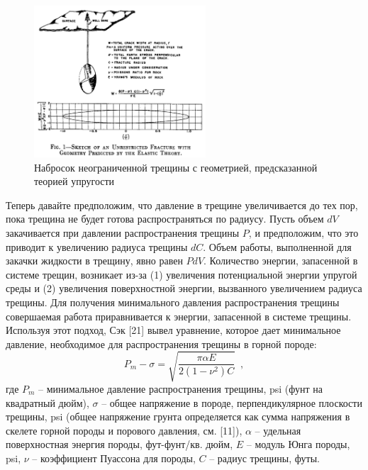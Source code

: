 \documentclass[a4paper, 12pt]{article}
\newcommand{\beq}{\begin{equation}}
\newcommand{\eeq}{\end{equation}}
\begin{document}
\setcounter{figure}{0}
\begin{figure}[H]
\center
\includegraphics[width=0.57\textwidth]{Perkins_1}
\caption{Набросок неограниченной трещины с геометрией, предсказанной теорией упругости}
\label{fig:Perkins1}
\end{figure}

Теперь давайте предположим, что давление в трещине увеличивается до тех пор, пока трещина не будет готова распространяться по радиусу.
Пусть объем $dV$ закачивается при давлении распространения трещины $P$, и предположим, что это приводит к увеличению радиуса трещины $dC$.
Объем работы, выполненной для закачки жидкости в трещину, явно равен $PdV$.
Количество энергии, запасенной в системе трещин, возникает из-за (1) увеличения потенциальной энергии упругой среды и (2) увеличения поверхностной энергии, вызванного увеличением радиуса трещины.
Для получения минимального давления распространения трещины совершаемая работа приравнивается к энергии, запасенной в системе трещины.
Используя этот подход, Сэк [21] вывел уравнение, которое дает минимальное давление, необходимое для распространения трещины в горной породе:
\beq\label{Perkins_1}
P_m-\sigma=\sqrt{\frac{\pi\alpha E}{2\left(1-\nu^2\right)C}}\,\,\,,
\tag{1}
\eeq
где $P_m$ -- минимальное давление распространения трещины, psi (фунт на квадратный дюйм),\newline
$\sigma$ -- общее напряжение в породе, перпендикулярное плоскости трещины, psi (общее напряжение грунта определяется как сумма напряжения в скелете горной породы и порового давления, см. [11]),\newline
$\alpha$ -- удельная поверхностная энергия породы, фут-фунт/кв. дюйм,\newline
$E$ -- модуль Юнга породы, psi,\newline
$\nu$ -- коэффициент Пуассона для породы,\newline
$C$ -- радиус трещины, футы.
\end{document}
